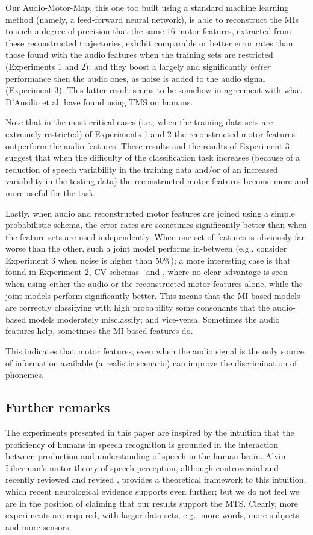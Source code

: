 Our Audio-Motor-Map, this one too built using a standard machine learning
method (namely, a feed-forward neural network), is able to reconstruct the MIs
to such a degree of precision that the same $16$ motor features, extracted from these
reconstructed trajectories, exhibit comparable or better error rates than  
those found with the audio features when the training sets are restricted (Experiments 1 and 2);
 and they boost a largely and significantly \emph{better} performance then the audio ones, as
noise is added to the audio signal (Experiment 3). This latter result seems to be
somehow in agreement with what D'Ausilio et al. have found using TMS on humans.

Note that in the most critical cases (i.e., when the training data sets are extremely restricted) of Experiments 1 and 2
the reconstructed motor features outperform the audio features. These results and the results of Experiment 3
suggest that when the difficulty of the classification task increases (because of a reduction of speech 
variability in the training data and/or of an increased variability in the testing data) the reconstructed 
motor features become more and more useful for the task.

Lastly, when audio and reconstructed motor features are joined using a simple probabilistic schema, the error rates
are sometimes significantly better than when the feature sets are used independently.
When one set of features is obviously far worse than the other, such a joint model performs in-between (e.g., consider
Experiment 3 when noise is higher than $50\%$); a more interesting case is that
found in Experiment 2, CV schemas \spkb\ and \spkc, where no clear advantage is seen
when using either the audio or the reconstructed motor features alone, while
the joint models perform significantly better. This means that the MI-based models are
correctly classifying with high probability some consonants that the audio-based models
moderately misclassify; and vice-versa. Sometimes the audio features help, sometimes the
MI-based features do.

This indicates that motor features, even when the audio signal is the only source of
information available (a realistic scenario) can improve the discrimination of phonemes.

\subsection{Further remarks}

The experiments presented in this paper are inspired by the intuition that the
proficiency of humans in speech recognition is grounded in the interaction
between production and understanding of speech in the human brain. Alvin
Liberman's motor theory of speech perception, although controversial and
recently reviewed and revised \cite{liberman1,liberman2,galant,massaro},
provides a theoretical framework to this intuition, which recent neurological
evidence \cite{dausilio} supports even further; but we do not feel we are in
the position of claiming that our results support the MTS. Clearly, more
experiments are required, with larger data sets, e.g., more words, more subjects
and more sensors.

